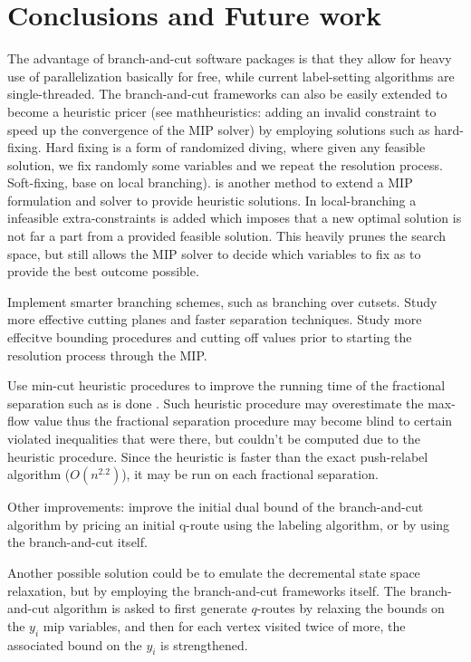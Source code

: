 \chapter{Conclusions and Future work}
\label{sec:conclusions-and-future-work}

The advantage of branch-and-cut software packages is that
they allow for heavy use of parallelization basically for free,
while current label-setting algorithms are single-threaded.
The branch-and-cut frameworks can also be easily extended
to become a heuristic pricer
(see mathheuristics: adding an invalid constraint to speed up the convergence of the MIP solver)
by employing
solutions such as hard-fixing.
Hard fixing is a form of randomized diving,
where given any feasible solution,
we fix randomly some variables and we repeat the resolution
process.
Soft-fixing, base on local branching). is another method
to extend a MIP formulation and solver to provide
heuristic solutions.
In local-branching a infeasible extra-constraints is added
which imposes that a new optimal solution
is not far a part from a provided feasible solution.
This heavily prunes the search space, but still
allows the MIP solver to decide which variables
to fix as to provide the best outcome possible.

Implement smarter branching schemes, such as branching over cutsets.
Study more effective cutting planes and
faster separation techniques.
Study more effecitve bounding procedures and cutting off values
prior to starting the resolution process through the MIP.

Use min-cut heuristic procedures to improve
the running time of the fractional separation
such as is done \textcite{kernighan1970}.
Such heuristic procedure may overestimate the max-flow
value thus the fractional separation procedure may
become blind to certain violated inequalities that were
there, but couldn't be computed due to the heuristic procedure.
Since the heuristic is faster than the exact push-relabel
algorithm ($O(n^2.2)$), it may be run on each fractional
separation.

Other improvements: improve the initial dual bound of the branch-and-cut
algorithm by pricing an initial q-route using the labeling algorithm,
or by using the branch-and-cut itself.

Another possible solution could be to emulate the decremental state space
relaxation, but by employing the branch-and-cut frameworks itself.
The branch-and-cut algorithm is asked to first generate $q$-routes by
relaxing the bounds on the $y_i$ mip variables,
and then for each vertex visited twice of more, the associated bound
on the $y_i$ is strengthened.

